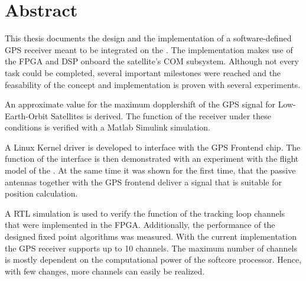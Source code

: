 \chapter*{Abstract}

This thesis documents the design and the implementation of a software-defined GPS receiver meant to be integrated on the \dscubesat. The implementation makes use of the FPGA and DSP onboard the satellite's COM subsystem.  Although not every task could be completed, several important milestones were reached and the feasability of the concept and implementation is proven with several experiments. 

An approximate value for the maximum dopplershift of the GPS signal for Low-Earth-Orbit Satellites is derived. The function of the receiver under these conditions is verified with a Matlab Simulink simulation. 

A Linux Kernel driver is developed to interface with the GPS Frontend chip. The function of the interface is then demonstrated with an experiment with the flight model of the \dscubesat. At the same time it was shown for the first time, that the passive antennas together with the GPS frontend deliver a signal that is suitable for position calculation.

A \gls{RTL} simulation is used to verify the function of the tracking loop channels that were implemented in the FPGA. Additionally, the performance of the designed fixed point algorithms was measured. With the current implementation the GPS receiver supports up to 10 channels. The maximum number of channels is mostly dependent on the computational power of the softcore processor. Hence, with few changes, more channels can easily be realized.
